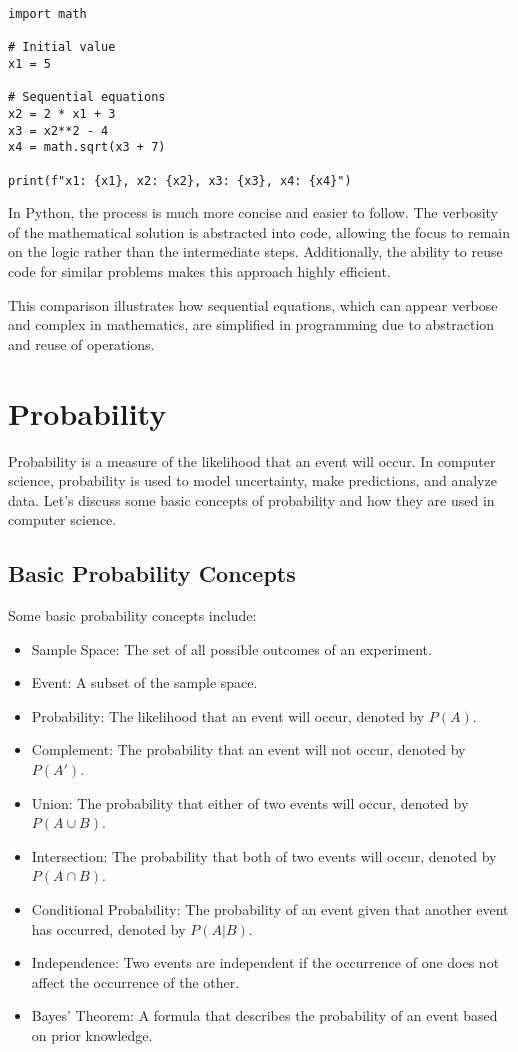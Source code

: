 \begin{lstlisting}[caption={Sequential Equations in Python}, label={lst:sequential-equations}]
import math

# Initial value
x1 = 5

# Sequential equations
x2 = 2 * x1 + 3
x3 = x2**2 - 4
x4 = math.sqrt(x3 + 7)

print(f"x1: {x1}, x2: {x2}, x3: {x3}, x4: {x4}")
\end{lstlisting}

In Python, the process is much more concise and easier to follow. The verbosity of the mathematical solution is abstracted into code, allowing the focus to remain on the logic rather than the intermediate steps. Additionally, the ability to reuse code for similar problems makes this approach highly efficient.

This comparison illustrates how sequential equations, which can appear verbose and complex in mathematics, are simplified in programming due to abstraction and reuse of operations.

\section{Probability}

Probability is a measure of the likelihood that an event will occur. In computer science, probability is used to model uncertainty, make predictions, and analyze data. Let's discuss some basic concepts of probability and how they are used in computer science.

\subsection{Basic Probability Concepts}

Some basic probability concepts include:

\begin{itemize}
    \item Sample Space: The set of all possible outcomes of an experiment.
    \item Event: A subset of the sample space.
    \item Probability: The likelihood that an event will occur, denoted by $P(A)$.
    \item Complement: The probability that an event will not occur, denoted by $P(A')$.
    \item Union: The probability that either of two events will occur, denoted by $P(A \cup B)$.
    \item Intersection: The probability that both of two events will occur, denoted by $P(A \cap B)$.
    \item Conditional Probability: The probability of an event given that another event has occurred, denoted by $P(A|B)$.
    \item Independence: Two events are independent if the occurrence of one does not affect the occurrence of the other.
    \item Bayes' Theorem: A formula that describes the probability of an event based on prior knowledge.
\end{itemize}

